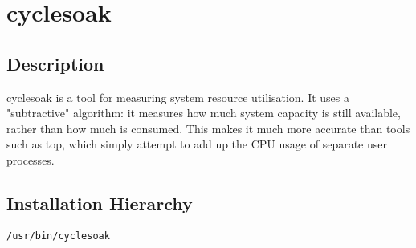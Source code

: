 \documentclass[a4paper]{report}
\begin{document}
\chapter{cyclesoak}
\section{Description}
cyclesoak is a tool for measuring system resource utilisation. 
It uses a "subtractive" algorithm: it measures how much system capacity is still available, 
rather than how much is consumed. This makes it much more accurate than tools such as top, 
which simply attempt to add up the CPU usage of separate user processes.
\section{Installation Hierarchy}
\begin{lstlisting}
/usr/bin/cyclesoak
\end{lstlisting}
\end{document}
